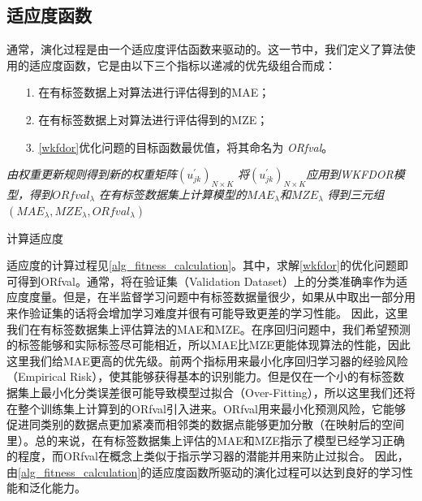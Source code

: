 \subsection{适应度函数}
通常，演化过程是由一个适应度评估函数来驱动的。这一节中，我们定义了算法使用的适应度函数，它是由以下三个指标以递减的优先级组合而成：
\begin{enumerate}
\item[1.]在有标签数据上对算法进行评估得到的MAE；
\item[2.]在有标签数据上对算法进行评估得到的MZE；
\item[3.]\autoref{wkfdor}优化问题的目标函数最优值，将其命名为 \textit{ORfval}。
\end{enumerate}

\IncMargin{1em}
\begin{algorithm}[htb]
\BlankLine
\emph{由权重更新规则得到新的权重矩阵$(u_{jk}^{'})_{N \times K}$}\;
\emph{将$(u_{jk}^{'})_{N \times K}$应用到WKFDOR模型，得到$ORfval_{\lambda}$}\;
\emph{在有标签数据集上计算模型的$MAE_{\lambda}$和$MZE_{\lambda}$}\;
\emph{得到三元组$(MAE_{\lambda},MZE_{\lambda},ORfval_{\lambda})$}\;
\caption{计算适应度}\label{alg_fitness_calculation}
\end{algorithm}\DecMargin{1em}



适应度的计算过程见\autoref{alg_fitness_calculation}。其中，求解\autoref{wkfdor}的优化问题即可得到ORfval。通常，将在验证集（Validation Dataset）上的分类准确率作为适应度度量。但是，在半监督学习问题中有标签数据量很少，如果从中取出一部分用来作验证集的话将会增加学习难度并很有可能导致更差的学习性能。 因此，这里我们在有标签数据集上评估算法的MAE和MZE。在序回归问题中，我们希望预测的标签能够和实际标签尽可能相近，所以MAE比MZE更能体现算法的性能，因此这里我们给MAE更高的优先级。前两个指标用来最小化序回归学习器的经验风险（Empirical Risk），使其能够获得基本的识别能力。但是仅在一个小的有标签数据集上最小化分类误差很可能导致模型过拟合（Over-Fitting），所以这里我们还将在整个训练集上计算到的ORfval引入进来。ORfval用来最小化预测风险，它能够促进同类别的数据点更加紧凑而相邻类的数据点能够更加分散（在映射后的空间里）。总的来说，在有标签数据集上评估的MAE和MZE指示了模型已经学习正确的程度，而ORfval在概念上类似于指示学习器的潜能并用来防止过拟合\citep{liu2000evolutionary}\citep{liu2003evolutionary}。
因此，由\autoref{alg_fitness_calculation}的适应度函数所驱动的演化过程可以达到良好的学习性能和泛化能力。

